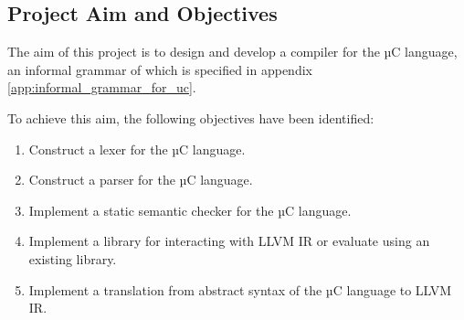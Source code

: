 
\subsection{Project Aim and Objectives}
\label{sec:intro_project_aim_and_objectives}

The aim of this project is to design and develop a compiler for the µC language, an informal grammar of which is specified in appendix \ref{app:informal_grammar_for_uc}.

To achieve this aim, the following objectives have been identified:

\begin{enumerate}
	\item \label{itm:obj_lexical_analysis} Construct a lexer for the µC language.
	\item \label{itm:obj_syntactic_analysis} Construct a parser for the µC language.
	\item \label{itm:obj_semantic_analysis} Implement a static semantic checker for the µC language.
	\item \label{itm:obj_intermediate_representation} Implement a library for interacting with LLVM IR or evaluate using an existing library.
	\item \label{itm:obj_ir_generation} Implement a translation from abstract syntax of the µC language to LLVM IR.
\end{enumerate}
